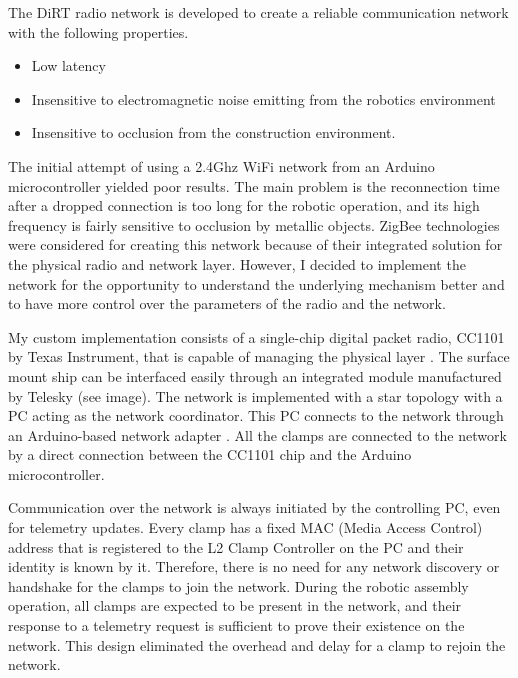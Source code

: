 The DiRT radio network is developed to create a reliable communication network with the following properties.
\begin{itemize}
    \item Low latency
    \item Insensitive to electromagnetic noise emitting from the robotics environment
    \item Insensitive to occlusion from the construction environment. 
\end{itemize}

The initial attempt of using a 2.4Ghz WiFi network from an Arduino microcontroller yielded poor results. The main problem is the reconnection time after a dropped connection is too long for the robotic operation, and its high frequency is fairly sensitive to occlusion by metallic objects. ZigBee technologies were considered for creating this network because of their integrated solution for the physical radio and network layer. However, I decided to implement the network for the opportunity to understand the underlying mechanism better and to have more control over the parameters of the radio and the network.


My custom implementation consists of a single-chip digital packet radio, CC1101 by Texas Instrument, that is capable of managing the physical layer \parencite{texasinstrumentsCC1101LowPowerSub12023}. The surface mount ship can be interfaced easily through an integrated module manufactured by Telesky (see image). The network is implemented with a star topology with a PC acting as the network coordinator. This PC connects to the network through an Arduino-based network adapter . All the clamps are connected to the network by a direct connection between the CC1101 chip and the Arduino microcontroller. 

Communication over the network is always initiated by the controlling PC, even for telemetry updates. Every clamp has a fixed MAC (Media Access Control) address that is registered to the L2 Clamp Controller  on the PC and their identity is known by it. Therefore, there is no need for any network discovery or handshake for the clamps to join the network. During the robotic assembly operation, all clamps are expected to be present in the network, and their response to a telemetry request is sufficient to prove their existence on the network. This design eliminated the overhead and delay for a clamp to rejoin the network.

